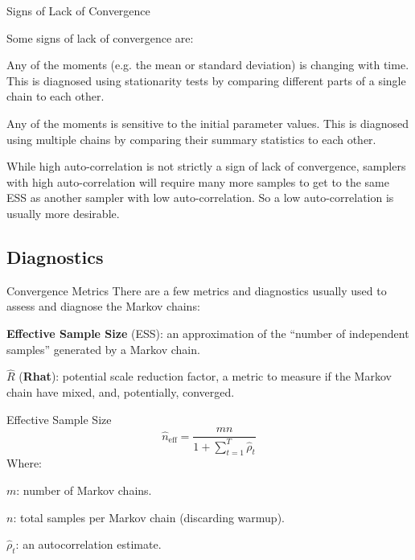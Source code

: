 \begin{frame}{Signs of Lack of Convergence}
    \begin{vfilleditems}
        \item Some signs of lack of convergence are:
            \begin{vfilleditems}
                \item Any of the moments (e.g. the mean or standard deviation) is changing with time. This is diagnosed using stationarity tests by comparing different parts of a single chain to each other.
                \item Any of the moments is sensitive to the initial parameter values. This is diagnosed using multiple chains by comparing their summary statistics to each other.
            \end{vfilleditems}
        \item While high auto-correlation is not strictly a sign of lack of convergence, samplers with high auto-correlation will require many more samples to get to the same ESS as another sampler with low auto-correlation. So a low auto-correlation is usually more desirable.
    \end{vfilleditems}
\end{frame}

\subsection{Diagnostics}
\begin{frame}{Convergence Metrics}
    There are a few metrics and diagnostics usually used to assess and diagnose the Markov chains:
    \begin{vfilleditems}
        \item \textbf{Effective Sample Size} (ESS):
        an approximation of the ``number of independent samples'' generated by a Markov chain.
        \item $\widehat{R}$ (\textbf{Rhat}):
        potential scale reduction factor,
        a metric to measure if the Markov chain have mixed,
        and, potentially, converged.
    \end{vfilleditems}
\end{frame}

\begin{frame}{Effective Sample Size \parencite{gelman2013bayesian}}
    $$\widehat{n}_{\text{eff}} = \frac{mn}{1 + \sum_{t=1}^T \widehat{\rho}_t}$$
    Where:
    \begin{vfilleditems}
        \item $m$: number of Markov chains.
        \item $n$: total samples per Markov chain (discarding warmup).
        \item $\widehat{\rho}_t$: an autocorrelation estimate.
    \end{vfilleditems}
\end{frame}

